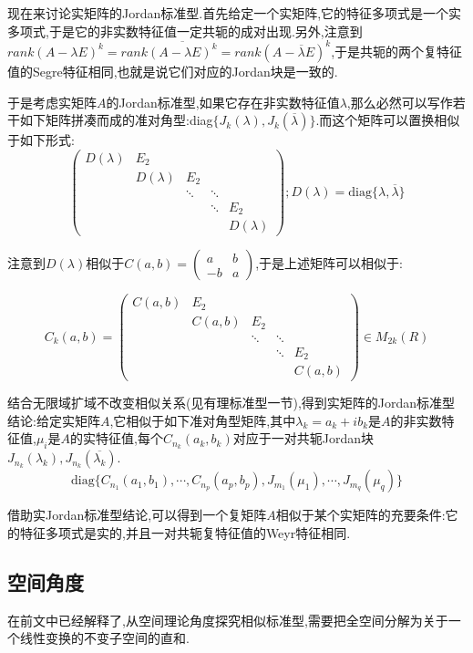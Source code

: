 现在来讨论实矩阵的Jordan标准型.首先给定一个实矩阵,它的特征多项式是一个实多项式,于是它的非实数特征值一定共轭的成对出现.另外,注意到$rank(A-\lambda E)^k=rank\overline{(A-\lambda E)^k}=rank(A-\overline{\lambda} E)^k$,于是共轭的两个复特征值的Segre特征相同,也就是说它们对应的Jordan块是一致的.

于是考虑实矩阵$A$的Jordan标准型,如果它存在非实数特征值$\lambda$,那么必然可以写作若干如下矩阵拼凑而成的准对角型:diag$\{J_k(\lambda),J_k(\overline{\lambda})\}$.而这个矩阵可以置换相似于如下形式:
$$\left(\begin{array}{ccccc}
D(\lambda)&E_2&&&\\
&D(\lambda)&E_2\\
&&\ddots&\ddots&\\
&&&\ddots&E_2\\
&&&&D(\lambda)
\end{array}\right);D(\lambda)=\mathrm{diag}\{\lambda,\overline{\lambda}\}$$

注意到$D(\lambda)$相似于$C(a,b)=\left(\begin{array}{cc}
a&b\\
-b&a
\end{array}\right)$,于是上述矩阵可以相似于:

$$C_k(a,b)=\left(\begin{array}{ccccc}
C(a,b)&E_2&&&\\
&C(a,b)&E_2\\
&&\ddots&\ddots&\\
&&&\ddots&E_2\\
&&&&C(a,b)
\end{array}\right)\in M_{2k}(R)$$

结合无限域扩域不改变相似关系(见有理标准型一节),得到实矩阵的Jordan标准型结论:给定实矩阵$A$,它相似于如下准对角型矩阵,其中$\lambda_k=a_k+ib_k$是$A$的非实数特征值,$\mu_i$是$A$的实特征值,每个$C_{n_k}(a_k,b_k)$对应于一对共轭Jordan块$J_ {n_k}(\lambda_k),J_{n_k}(\overline{\lambda_k})$.
$$\mathrm{diag}\{C_{n_1}(a_1,b_1),\cdots,C_{n_p}(a_p,b_p),J_{m_1}(\mu_1),\cdots,J_{m_q}(\mu_q)\}$$

借助实Jordan标准型结论,可以得到一个复矩阵$A$相似于某个实矩阵的充要条件:它的特征多项式是实的,并且一对共轭复特征值的Weyr特征相同.
\newpage
\subsection{空间角度}

在前文中已经解释了,从空间理论角度探究相似标准型,需要把全空间分解为关于一个线性变换的不变子空间的直和.

